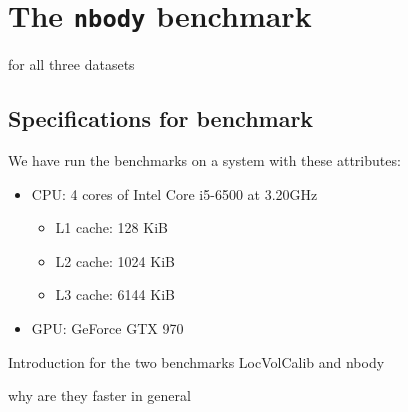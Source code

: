 \section*{The \texttt{nbody} benchmark}

for all three datasets


\subsection*{Specifications for benchmark}
We have run the benchmarks on a system with these attributes:
\begin{itemize}
\item CPU: 4 cores of Intel Core i5-6500 at 3.20GHz
  \begin{itemize}
  \item L1 cache: 128 KiB 
  \item L2 cache: 1024 KiB 
  \item L3 cache: 6144 KiB 
  \end{itemize}
\item GPU: GeForce GTX 970
\end{itemize}


Introduction for the two benchmarks LocVolCalib and nbody



why are they faster in general




